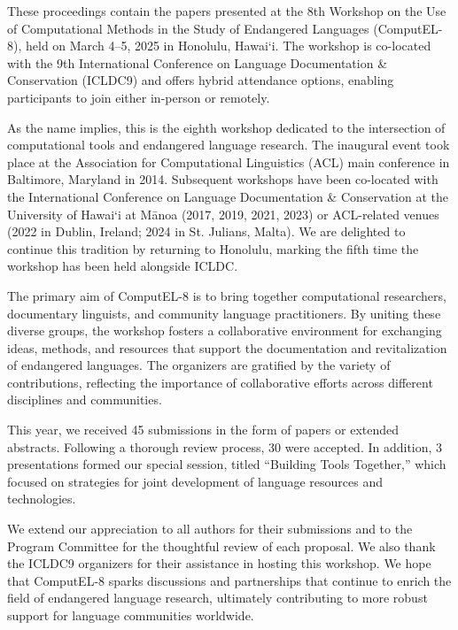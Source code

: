 These proceedings contain the papers presented at the 8th Workshop on the Use of Computational Methods in the Study of Endangered Languages (ComputEL-8), held on March 4–5, 2025 in Honolulu, Hawai‘i. The workshop is co-located with the 9th International Conference on Language Documentation \& Conservation (ICLDC9) and offers hybrid attendance options, enabling participants to join either in-person or remotely.

As the name implies, this is the eighth workshop dedicated to the intersection of computational tools and endangered language research. The inaugural event took place at the Association for Computational Linguistics (ACL) main conference in Baltimore, Maryland in 2014. Subsequent workshops have been co-located with the International Conference on Language Documentation \& Conservation at the University of Hawai‘i at Mānoa (2017, 2019, 2021, 2023) or ACL-related venues (2022 in Dublin, Ireland; 2024 in St. Julians, Malta). We are delighted to continue this tradition by returning to Honolulu, marking the fifth time the workshop has been held alongside ICLDC.

The primary aim of ComputEL-8 is to bring together computational researchers, documentary linguists, and community language practitioners. By uniting these diverse groups, the workshop fosters a collaborative environment for exchanging ideas, methods, and resources that support the documentation and revitalization of endangered languages. The organizers are gratified by the variety of contributions, reflecting the importance of collaborative efforts across different disciplines and communities.

This year, we received 45 submissions in the form of papers or extended abstracts. Following a thorough review process, 30 were accepted. In addition, 3 presentations formed our special session, titled “Building Tools Together,” which focused on strategies for joint development of language resources and technologies.

We extend our appreciation to all authors for their submissions and to the Program Committee for the thoughtful review of each proposal. We also thank the ICLDC9 organizers for their assistance in hosting this workshop. We hope that ComputEL-8 sparks discussions and partnerships that continue to enrich the field of endangered language research, ultimately contributing to more robust support for language communities worldwide.